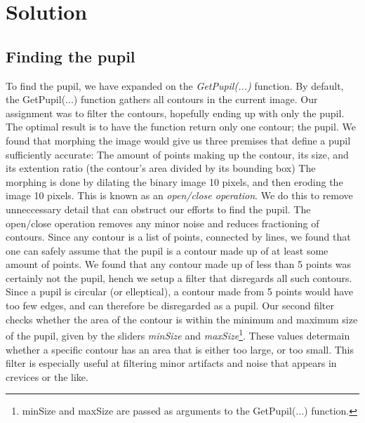 \section{Solution}

\subsection{Finding the pupil}
To find the pupil, we have expanded on the \emph{GetPupil(...)} function.\newline
By default, the GetPupil(...) function gathers all contours in the current image. Our assignment was to filter the contours, hopefully ending up with only the pupil.\newline
\newline
The optimal result is to have the function return only one contour; the pupil. We found that morphing the image would give us three premises that define a pupil sufficiently accurate: The amount of points making up the contour, its size, and its extention ratio (the contour's area divided by its bounding box)\newline
\newline
The morphing is done by dilating the binary image 10 pixels, and then eroding the image 10 pixels. This is known as an \emph{open/close operation}. We do this to remove unneccessary detail that can obstruct our efforts to find the pupil. The open/close operation removes any minor noise and reduces fractioning of contours.\newline
\newline
Since any contour is a list of points, connected  by lines, we found that one can safely assume that the pupil is a contour made up of at least some amount of points. We found that any contour made up of less than 5 points was certainly not the pupil, hench we setup a filter that disregards all such contours. Since a pupil is circular (or elleptical), a contour made from 5 points would have too few edges, and can therefore be disregarded as a pupil.\newline
\newline
Our second filter checks whether the area of the contour is within the minimum and maximum size of the pupil, given by the sliders \emph{minSize} and \emph{maxSize}\footnote{minSize and maxSize are passed as arguments to the GetPupil(...) function.}. These values determain whether a specific contour has an area that is either too large, or too small. This filter is especially useful at filtering minor artifacts and noise that appears in crevices or the like.\newline
